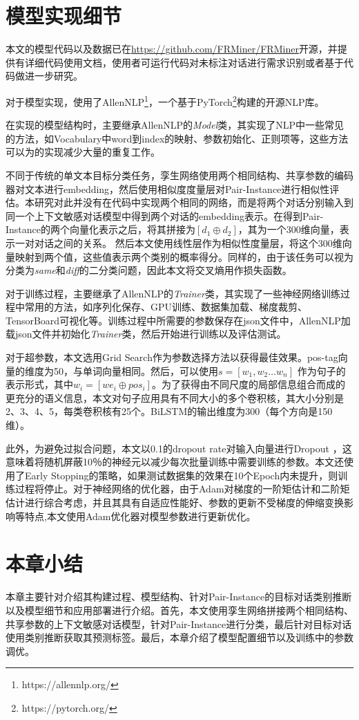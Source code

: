 \section{{\tool}模型实现细节}
本文的{\tool}模型代码以及数据已在\href{https://github.com/FRMiner/FRMiner}{https://github.com/FRMiner/FRMiner}开源，并提供有详细代码使用文档，使用者可运行代码对未标注对话进行需求识别或者基于代码做进一步研究。

对于模型实现，{\tool}使用了AllenNLP\footnote{https://allennlp.org/}，一个基于PyTorch\footnote{https://pytorch.org/}构建的开源NLP库。

在实现{\tool}的模型结构时，主要继承AllenNLP的\textit{Model}类，其实现了NLP中一些常见的方法，如Vocabulary中word到index的映射、参数初始化、正则项等，这些方法可以为{\tool}的实现减少大量的重复工作。

不同于传统的单文本目标分类任务，孪生网络使用两个相同结构、共享参数的编码器对文本进行embedding，然后使用相似度度量层对Pair-Instance进行相似性评估。本研究对此并没有在代码中实现两个相同的网络，而是将两个对话分别输入到同一个上下文敏感对话模型中得到两个对话的embedding表示。在得到Pair-Instance的两个向量化表示之后，将其拼接为$[{d_1}\oplus {d_2}]$，其为一个300维向量，表示一对对话之间的关系。
然后本文使用线性层作为相似性度量层，将这个300维向量映射到两个值，这些值表示两个类别的概率得分。同样的，由于该任务可以视为分类为\textit{same}和\textit{diff}的二分类问题，因此本文将交叉熵用作损失函数。

对于训练过程，主要继承了AllenNLP的\textit{Trainer}类，其实现了一些神经网络训练过程中常用的方法，如序列化保存、GPU训练、数据集加载、梯度裁剪、TensorBoard可视化等。训练过程中所需要的参数保存在json文件中，AllenNLP加载json文件并初始化\textit{Trainer}类，然后开始进行训练以及评估测试。

对于超参数，本文选用Grid Search\cite{Bergstra2012Random}作为参数选择方法以获得最佳效果。pos-tag向量的维度为50，与单词向量相同。然后，可以使用$s=[w_1,w_2\dots w_n]$ 作为句子的表示形式，其中$w_i=[we_i\oplus pos_i]$。为了获得由不同尺度的局部信息组合而成的更充分的语义信息，本文对句子应用具有不同大小的多个卷积核，其大小分别是2、3、4、5，每类卷积核有25个。BiLSTM的输出维度为300（每个方向是150维）。

此外，为避免过拟合问题，本文以0.1的dropout rate对输入向量进行Dropout \cite{srivastava2014dropout}，这意味着将随机屏蔽10％的神经元以减少每次批量训练中需要训练的参数。本文还使用了Early Stopping\cite{prechelt1998early}的策略，如果测试数据集的效果在10个Epoch内未提升，则训练过程将停止。对于神经网络的优化器，由于Adam\cite{kingma2014adam}对梯度的一阶矩估计和二阶矩估计进行综合考虑，并且其具有自适应性能好、参数的更新不受梯度的伸缩变换影响等特点,本文使用Adam优化器对模型参数进行更新优化。




\section{本章小结}

本章主要针对{\tool}介绍其构建过程、模型结构、针对Pair-Instance的目标对话类别推断以及模型细节和应用部署进行介绍。首先，本文使用孪生网络拼接两个相同结构、共享参数的上下文敏感对话模型，针对Pair-Instance进行分类，最后针对目标对话使用类别推断获取其预测标签。最后，本章介绍了模型配置细节以及训练中的参数调优。